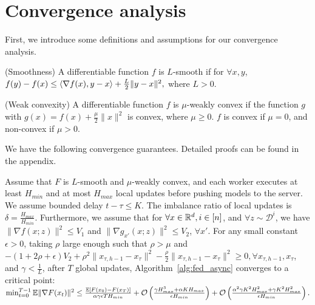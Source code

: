 \documentclass{opt2020} %
\begin{document}
\section{Convergence analysis}

First, we introduce some definitions and assumptions for our convergence analysis.
\begin{definition} (Smoothness)
A differentiable function $f$ is $L$-smooth if for $\forall x, y$,
$
f(y) - f(x) \leq \left\langle \nabla f(x), y-x \right \rangle + \frac{L}{2} \|y-x\|^2,
$
where $L > 0$.
\end{definition}

\begin{definition} (Weak convexity)
A differentiable function $f$ is $\mu$-weakly convex if the function $g$ with $g(x) = f(x) + \frac{\mu}{2} \|x\|^2$ is convex,
where $\mu \geq 0$.
$f$ is convex if $\mu=0$, and non-convex if $\mu > 0$.
\end{definition}

We have the following convergence guarantees. Detailed proofs can be found in the appendix.

\begin{theorem}
Assume that $F$ is $L$-smooth and $\mu$-weakly convex, and each worker executes at least $H_{min}$ and at most $H_{max}$ local updates before pushing models to the server. We assume bounded delay $t-\tau \leq K$. The imbalance ratio of local updates is $\delta = \frac{H_{max}}{H_{min}}$. Furthermore, we assume that for $\forall x \in {\mathbb{R}}^d, i \in [n]$, and $\forall z \sim \mathcal{D}^i$, we have $\| \nabla f(x; z) \|^2 \leq V_1$ and $\| \nabla g_{x'}(x; z) \|^2 \leq V_2$, $\forall x'$. For any small constant $\epsilon > 0$, taking $\rho$ large enough such that $\rho > \mu$ and $- (1 + 2 \rho + \epsilon) V_2 + \rho^2 \|x_{\tau, h-1} - x_\tau\|^2 - \frac{\rho}{2} \|x_{\tau, h-1} - x_\tau\|^2 \geq 0, \forall x_{\tau, h-1}, x_{\tau}$, and $\gamma < \frac{1}{L}$, after $T$ global updates, Algorithm~\ref{alg:fed_async} converges to a critical point:
$
\min_{t = 0}^{T-1} {\mathbb{E}} \| \nabla F(x_t) \|^2 \leq \frac{{\mathbb{E}}\left[ F(x_{0}) - F(x_T) \right]}{\alpha \gamma \epsilon T H_{min}}
+ {\mathcal O}\left( \frac{\gamma H_{max}^3 + \alpha K H_{max} }{\epsilon H_{min}} \right)
+ {\mathcal O}\left( \frac{\alpha^2\gamma K^2 H_{max}^2 + \gamma K^2 H_{max}^2 }{\epsilon H_{min}} \right).
$
\end{theorem}
\end{document}
